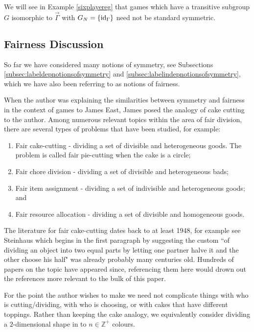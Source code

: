 We will see in Example \ref{sixplayereg} that games which have a transitive subgroup $G$ isomorphic to $\overrightarrow{\Gamma}$ with $G_N = \{\text{id}_{\Gamma}\}$ need not be standard symmetric. 

\subsection{Fairness Discussion} \label{subsec:fairnessdiscussion}
So far we have considered many notions of symmetry, see Subsections \ref{subsec:labeldepnotionsofsymmetry} and \ref{subsec:labelindepnotionsofsymmetry}, which we have also been referring to as notions of fairness. 

When the author was explaining the similarities between symmetry and fairness in the context of games to James East, James posed the analogy of cake cutting to the author. Among numerous relevant topics within the area of fair division, there are several types of problems that have been studied, for example:
\begin{enumerate}
	\item Fair cake-cutting - dividing a set of divisible and heterogeneous goods. The problem is called fair pie-cutting when the cake is a circle;
	\item Fair chore division - dividing a set of divisible and heterogeneous bads;
	\item Fair item assignment - dividing a set of indivisible and heterogeneous goods; and
	\item Fair resource allocation - dividing a set of divisible and homogeneous goods.
\end{enumerate}

The literature for fair cake-cutting dates back to at least 1948, for example see Steinhaus \cite{Steinhauscakecutting} which begins in the first paragraph by suggesting the custom ``of dividing an object into two equal parts by letting one partner halve it and the other choose his half" was already probably many centuries old. Hundreds of papers on the topic have appeared since, referencing them here would drown out the references more relevant to the bulk of this paper. 

For the point the author wishes to make we need not complicate things with who is cutting/dividing, with who is choosing, or with cakes that have different toppings. Rather than keeping the cake analogy, we equivalently consider dividing a $2$-dimensional shape in to $n \in \mathbb{Z}^+$ colours. 

